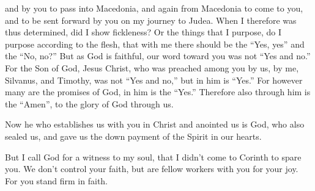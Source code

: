 {and by you to pass into Macedonia, and again from Macedonia to come to you, and to be sent forward by you on my journey to Judea.
When I therefore was thus determined, did I show fickleness? Or the things that I purpose, do I purpose according to the flesh, that with me there should be the “Yes, yes” and the “No, no?”
But as God is faithful, our word toward you was not “Yes and no.”
For the Son of God, Jesus Christ, who was preached among you by us, by me, Silvanus, and Timothy, was not “Yes and no,” but in him is “Yes.”
For however many are the promises of God, in him is the “Yes.” Therefore also through him is the “Amen”, to the glory of God through us.
\par }{\PP {}Now he who establishes us with you in Christ and anointed us is God,
who also sealed us, and gave us the down payment of the Spirit in our hearts.
\par }{\PP {}But I call God for a witness to my soul, that I didn’t come to Corinth to spare you.
We don’t control your faith, but are fellow workers with you for your joy. For you stand firm in faith.

}
